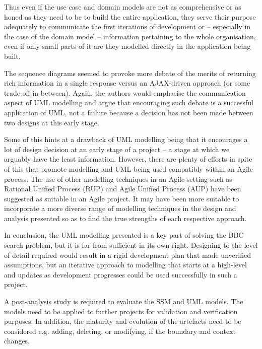 \documentclass[oribibl]{llncs}
\begin{document}
Thus even if the use case and domain models are not as comprehensive or
as honed as they need to be to build the entire application, they serve
their purpose adequately to communicate the first iterations of
development or -- especially in the case of the domain model -- information
pertaining to the whole organisation, even if only small parts of it are
they modelled directly in the application being built.

The sequence diagrams seemed to provoke more debate of the merits of
returning rich information in a single response versus an AJAX-driven
approach (or some trade-off in between). Again, the authors would emphasise the
communication aspect of UML modelling and argue that encouraging such debate
is a successful application of UML, not a failure because a decision
has not been made between two designs at this early stage.

Some of this hints at a drawback of UML modelling being that it encourages
a lot of design decision at an early stage of a project -- a stage at which we arguably
have the least information. \citep{kelly2013conway} However, there are plenty of
efforts in spite of this that promote modelling and UML being used
compatibly within an Agile process. The use of other modelling techniques
in an Agile setting such as
Rational Unified Process (RUP) and Agile Unified Process (AUP) have been
suggested as suitable in an Agile project.
\citep{ambler2002agile} It may have been more suitable to incorporate
a more diverse range of modelling techniques in the design and analysis
presented so as to find the true strengths of each respective approach.

In conclusion, the UML modelling presented is a key part of solving
the BBC search problem, but it is far from sufficient in its own right.
Designing to the level of detail required would result in a rigid
development plan that made unverified assumptions, but an iterative
approach to modelling that starts at a high-level and updates as
development progresses could be used successfully in such a project.

A post-analysis study is required to evaluate the SSM and UML models. The models
need to be applied to further projects for validation and verification purposes.
In addition, the maturity and evolution of the artefacts need to be considered
e.g. adding, deleting, or modifying, if the boundary and context changes.



\end{document}
